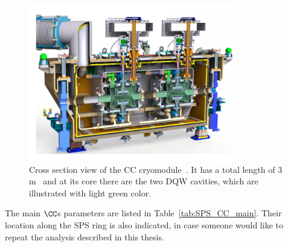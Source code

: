 \begin{figure}[h]
   \centering         
   \includegraphics[width=0.8\textwidth]{images/Ch4/CC_cryomodule.png}
       \caption{Cross section view of the CC cryomodule~\cite{Zanoni:2017}. It has a total length of 3\,m~\cite{Baudrenghien:1520896} and at its core there are the two DQW cavities, which are illustrated with light green color.}
       \label{fig:DQW_cryomodule}
\end{figure}


The main $\CC$s parameters are listed in Table~\ref{tab:SPS_CC_main}. Their location along the SPS ring is also indicated, in case someone would like to repeat the analysis described in this thesis.

